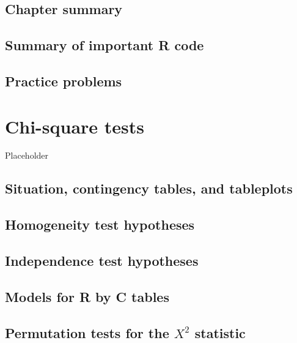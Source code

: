 \documentclass[]{book}
\begin{document}
\hypertarget{section4-7}{%
\section{Chapter summary}\label{section4-7}}

\hypertarget{section4-8}{%
\section{Summary of important R code}\label{section4-8}}

\hypertarget{section4-9}{%
\section{Practice problems}\label{section4-9}}

\hypertarget{chapter5}{%
\chapter{Chi-square tests}\label{chapter5}}

Placeholder

\hypertarget{section5-1}{%
\section{Situation, contingency tables, and tableplots}\label{section5-1}}

\hypertarget{section5-2}{%
\section{Homogeneity test hypotheses}\label{section5-2}}

\hypertarget{section5-3}{%
\section{Independence test hypotheses}\label{section5-3}}

\hypertarget{section5-4}{%
\section{Models for R by C tables}\label{section5-4}}

\hypertarget{section5-5}{%
\section{\texorpdfstring{Permutation tests for the \(X^2\) statistic}{Permutation tests for the X\^{}2 statistic}}\label{section5-5}}
\end{document}
